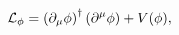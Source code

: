\begin{equation}\label{3.1}
{\cal L}_{\phi} = \left( \partial_\mu \phi \right)^\dagger \left(
\partial^\mu \phi \right) + V(\phi),
\end{equation}

